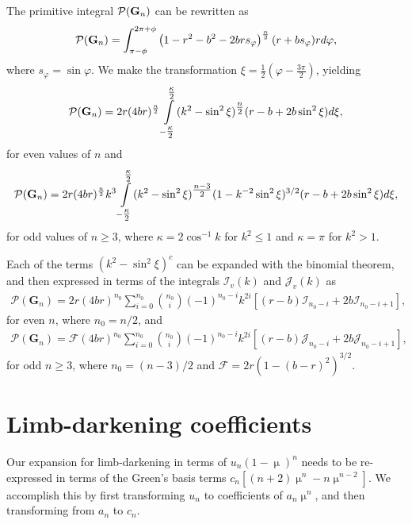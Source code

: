 \documentclass[modern]{aastex61}
\begin{document}
The primitive integral
$\mathcal{P}({\mathbf{G}}_n)$ can be rewritten as
\begin{equation}
\mathcal{P}(\bvec{G}_n) = 
\int_{\pi-\phi}^{2\pi + \phi} \left(1-r^2-b^2-2br s_\varphi\right)^{\frac{n}{2}} (r+b s_\varphi) r d\varphi,
\end{equation}
where $s_\varphi = \sin{\varphi}$.
We make the transformation $\xi = \tfrac{1}{2} \left(\varphi - \tfrac{3\pi}{2}\right)$, yielding
\begin{equation}
\mathcal{P}(\bvec{G}_n) = 
2r (4br)^{\frac{n}{2}}\int\displaylimits_{-\tfrac{\kappa}{2}}^{\tfrac{\kappa}{2}} 
(k^2-\sin^2\xi)^{\tfrac{n}{2}} (r-b + 2b \sin^2 \xi) d\xi,
\end{equation}
for even values of $n$ and 
\begin{equation}
\mathcal{P}(\bvec{G}_n) =
2r (4br)^{\frac{n}{2}} k^3 \int\displaylimits_{-\tfrac{\kappa}{2}}^{\tfrac{\kappa}{2}} 
(k^2-\sin^2\xi)^{\tfrac{n-3}{2}} (1-k^{-2} \sin^2 \xi)^{3/2} (r-b + 2b \sin^2 \xi) d\xi,
\end{equation}
for odd values of $n \ge 3$, where $\kappa = 2 \cos^{-1}k$ for $k^2 \le 1$ and
$\kappa = \pi$ for $k^2 > 1$.

Each of the terms $(k^2-\sin^2\xi)^c$ can be expanded with the binomial theorem,
and then expressed in terms of the integrals $\mathcal{I}_v(k)$ and $\mathcal{J}_v(k)$ as
\begin{eqnarray}
\mathcal{P}(\mathbf{G}_n)
= 2r(4br)^{n_0} \sum_{i=0}^{n_0} \binom{n_0}{i}(-1)^{n_0-i} k^{2i} \left[(r-b)\mathcal{I}_{n_0-i} + 2b \mathcal{I}_{n_0-i+1}\right],
\end{eqnarray}
for even $n$, where $n_0 = n/2$, and
\begin{eqnarray}
\mathcal{P}(\mathbf{G}_n) 
= \mathcal{F}(4br)^{n_0} \sum_{i=0}^{n_0} \binom{n_0}{i} (-1)^{n_0-i} k^{2i} \left[(r-b)\mathcal{J}_{n_0-i} + 2b \mathcal{J}_{n_0-i+1}\right],
\end{eqnarray}
for odd $n \ge 3$, where $n_0 = (n-3)/2$ and
 $\mathcal{F} = 2r(1-(b-r)^2)^{3/2}$.
\section{Limb-darkening coefficients}

Our expansion for limb-darkening in terms of $u_n(1-\upmu)^n$ needs to
be re-expressed in terms of the Green's basis terms $c_n \left[(n+2)\upmu^n -n \upmu^{n-2}\right]$.
We accomplish this by first transforming $u_n$ to coefficients of $a_n \upmu^n$,
and then transforming from $a_n$ to $c_n$.
\end{document}
